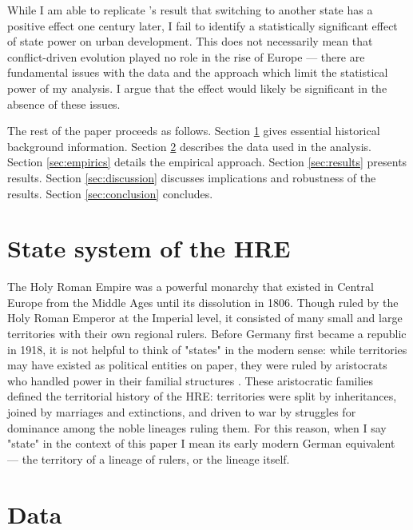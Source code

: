 \documentclass[11pt, a4paper]{article}
\begin{document}
While I am able to replicate \cite{schoenholzer2022}'s result that switching to another state has a positive effect one century later, I fail to identify a statistically significant effect of state power on urban development. This does not necessarily mean that conflict-driven evolution played no role in the rise of Europe --- there are fundamental issues with the data and the approach which limit the statistical power of my analysis. I argue that the effect would likely be significant in the absence of these issues.

The rest of the paper proceeds as follows. Section \ref{sec:background} gives essential historical background information. Section \ref{sec:data} describes the data used in the analysis. Section \ref{sec:empirics} details the empirical approach. Section \ref{sec:results} presents results. Section \ref{sec:discussion} discusses implications and robustness of the results. Section \ref{sec:conclusion} concludes.



\section{State system of the HRE} \label{sec:background}

The Holy Roman Empire was a powerful monarchy that existed in Central Europe from the Middle Ages until its dissolution in 1806. Though ruled by the Holy Roman Emperor at the Imperial level, it consisted of many small and large territories with their own regional rulers. Before Germany first became a republic in 1918, it is not helpful to think of "states" in the modern sense: while territories may have existed as political entities on paper, they were ruled by aristocrats who handled power in their familial structures \citep[pp. 2-3]{pt2}. These aristocratic families defined the territorial history of the HRE: territories were split by inheritances, joined by marriages and extinctions, and driven to war by struggles for dominance among the noble lineages ruling them. For this reason, when I say "state" in the context of this paper I mean its early modern German equivalent --- the territory of a lineage of rulers, or the lineage itself.


\section{Data} \label{sec:data}
\end{document}
